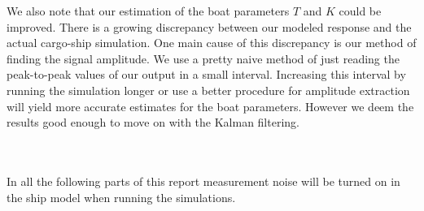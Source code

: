 We also note that our estimation of the boat parameters $T$ and $K$ could be improved. There is a growing discrepancy between our modeled response and the actual cargo-ship simulation. One main cause of this discrepancy is our method of finding the signal amplitude. We use a pretty naive method of just reading the peak-to-peak values of our output in a small interval. Increasing this interval by running the simulation longer or use a better procedure for amplitude extraction will yield more accurate estimates for the boat parameters. However we deem the results good enough to move on with the Kalman filtering.

\\\\

In all the following parts of this report measurement noise will be turned on in the ship model when running the simulations.
